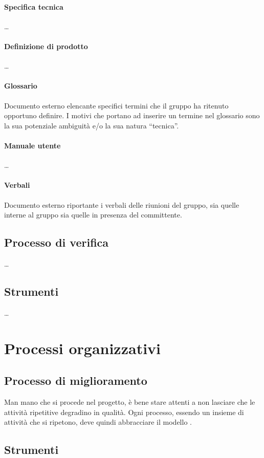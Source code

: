 \paragraph{Specifica tecnica} \dots
\paragraph{Definizione di prodotto} \dots
\paragraph{Glossario} Documento esterno elencante specifici termini che il gruppo ha ritenuto opportuno definire. I motivi che portano ad inserire un termine nel glossario sono la sua potenziale ambiguità e/o la sua natura “tecnica”.
\paragraph{Manuale utente} \dots
\paragraph{Verbali} Documento esterno riportante i verbali delle riunioni del gruppo, sia quelle interne al gruppo sia quelle in presenza del committente.

\subsection{Processo di verifica} \dots

\subsection{Strumenti} \dots

\section{Processi organizzativi}

\subsection{Processo di miglioramento} %
Man mano che si procede nel progetto, è bene stare attenti a non lasciare che le attività ripetitive degradino in qualità. Ogni processo, essendo un insieme di attività che si ripetono, deve quindi abbracciare il modello . %

\subsection{Strumenti}


